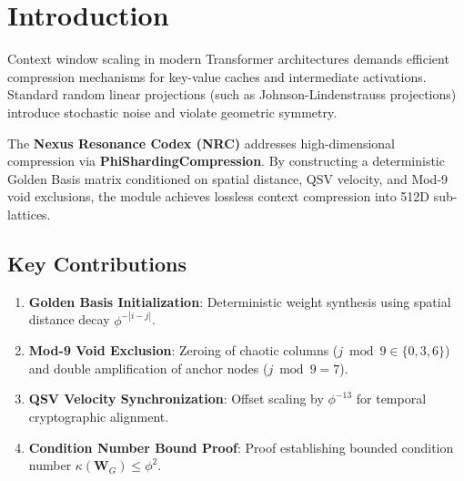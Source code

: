 \section{Introduction}
Context window scaling in modern Transformer architectures demands efficient compression mechanisms for key-value caches and intermediate activations. Standard random linear projections (such as Johnson-Lindenstrauss projections) introduce stochastic noise and violate geometric symmetry.

The \textbf{Nexus Resonance Codex (NRC)} addresses high-dimensional compression via \textbf{PhiShardingCompression}. By constructing a deterministic Golden Basis matrix conditioned on spatial distance, QSV velocity, and Mod-9 void exclusions, the module achieves lossless context compression into 512D sub-lattices.

\subsection{Key Contributions}
\begin{enumerate}[label=\textbf{\arabic*.}]
    \item \textbf{Golden Basis Initialization}: Deterministic weight synthesis using spatial distance decay $\phi^{-|i-j|}$.
    \item \textbf{Mod-9 Void Exclusion}: Zeroing of chaotic columns ($j \bmod 9 \in \{0,3,6\}$) and double amplification of anchor nodes ($j \bmod 9 = 7$).
    \item \textbf{QSV Velocity Synchronization}: Offset scaling by $\phi^{-13}$ for temporal cryptographic alignment.
    \item \textbf{Condition Number Bound Proof}: Proof establishing bounded condition number $\kappa(\mathbf{W}_G) \le \phi^2$.
\end{enumerate}